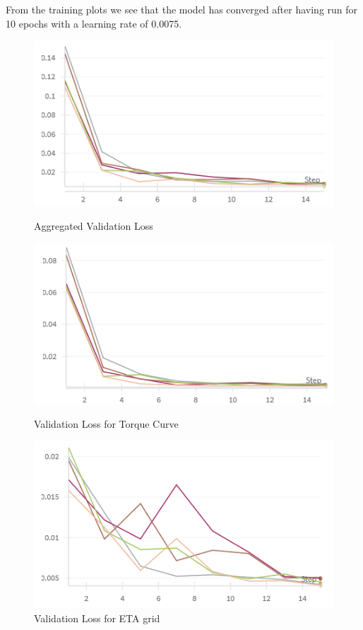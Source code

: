 \documentclass{report} %
\begin{document}
From the training plots we see that the model has converged after having run for 10 epochs with a learning rate of 0.0075.

\begin{figure}[H]
    \centering
    \begin{minipage}[b]{0.3\textwidth}
        \includegraphics[width=\textwidth]{./ReportImages/val_loss.png}
        \caption{Aggregated Validation Loss}
        \label{fig:Aggregated Validation Loss}
    \end{minipage}
    \begin{minipage}[b]{0.3\textwidth}
        \includegraphics[width=\textwidth]{./ReportImages/val_loss_y1.png}
        \caption{Validation Loss for Torque Curve}
        \label{fig:Validation Loss for Torque Curve}
    \end{minipage}
    \hfill
    \begin{minipage}[b]{0.3\textwidth}
        \includegraphics[width=\textwidth]{./ReportImages/val_loss_y2.png}
        \caption{Validation Loss for ETA grid}
        \label{fig:Validation Loss for ETA grid}
    \end{minipage}
\end{figure}
\end{document}
